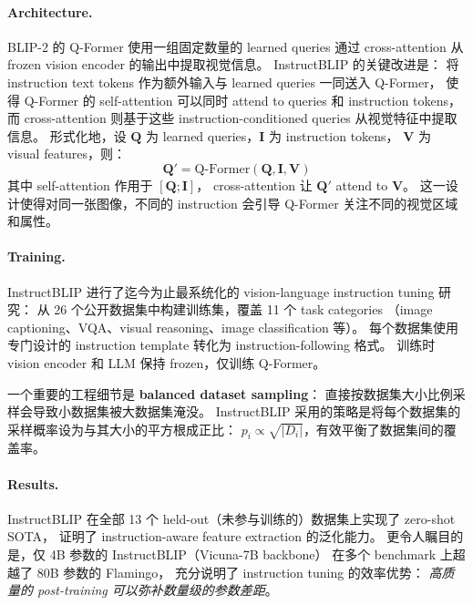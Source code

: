 \paragraph{Architecture.}
BLIP-2 的 Q-Former 使用一组固定数量的 learned queries
通过 cross-attention 从 frozen vision encoder 的输出中提取视觉信息。
InstructBLIP 的关键改进是：
将 instruction text tokens 作为额外输入与 learned queries 一同送入 Q-Former，
使得 Q-Former 的 self-attention 可以同时 attend to queries 和 instruction tokens，
而 cross-attention 则基于这些 instruction-conditioned queries 从视觉特征中提取信息。
形式化地，设 $\mathbf{Q}$ 为 learned queries，$\mathbf{I}$ 为 instruction tokens，
$\mathbf{V}$ 为 visual features，则：
\begin{equation}
  \mathbf{Q}' = \text{Q-Former}(\mathbf{Q}, \mathbf{I}, \mathbf{V})
\end{equation}
其中 self-attention 作用于 $[\mathbf{Q}; \mathbf{I}]$，
cross-attention 让 $\mathbf{Q}'$ attend to $\mathbf{V}$。
这一设计使得对同一张图像，不同的 instruction 会引导 Q-Former 关注不同的视觉区域和属性。

\paragraph{Training.}
InstructBLIP 进行了迄今为止最系统化的 vision-language instruction tuning 研究：
从 26 个公开数据集中构建训练集，覆盖 11 个 task categories
（image captioning、VQA、visual reasoning、image classification 等）。
每个数据集使用专门设计的 instruction template 转化为 instruction-following 格式。
训练时 vision encoder 和 LLM 保持 frozen，仅训练 Q-Former。

一个重要的工程细节是 \textbf{balanced dataset sampling}：
直接按数据集大小比例采样会导致小数据集被大数据集淹没。
InstructBLIP 采用的策略是将每个数据集的采样概率设为与其大小的平方根成正比：
$p_i \propto \sqrt{|D_i|}$，有效平衡了数据集间的覆盖率。

\paragraph{Results.}
InstructBLIP 在全部 13 个 held-out（未参与训练的）数据集上实现了 zero-shot SOTA，
证明了 instruction-aware feature extraction 的泛化能力。
更令人瞩目的是，仅 4B 参数的 InstructBLIP（Vicuna-7B backbone）
在多个 benchmark 上超越了 80B 参数的 Flamingo，
充分说明了 instruction tuning 的效率优势：
\textit{高质量的 post-training 可以弥补数量级的参数差距}。

